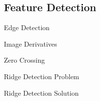 %
%

\subsection{Feature Detection}
\begin{frame}{Edge Detection}
\end{frame}

\begin{frame}{Image Derivatives}
\end{frame}

\begin{frame}{Zero Crossing}
\end{frame}


\begin{frame}{Ridge Detection Problem}
\end{frame}

\begin{frame}{Ridge Detection Solution}
\end{frame}




